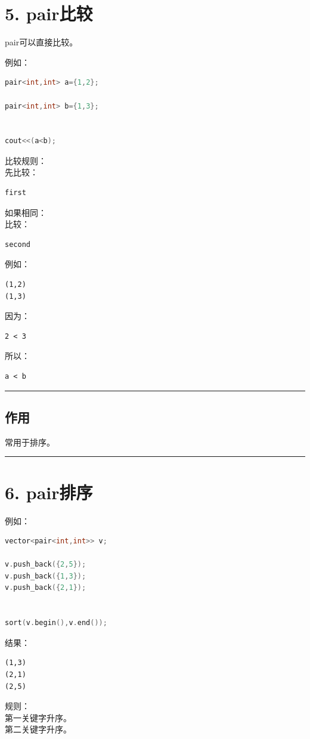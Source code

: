 \documentclass[10pt,twocolumn]{extarticle}
\begin{document}
\section{5. pair比较}

pair可以直接比较。

例如：
\begin{lstlisting}[language=C++]
pair<int,int> a={1,2};

pair<int,int> b={1,3};


cout<<(a<b);
\end{lstlisting}
比较规则：\\
先比较：
\begin{lstlisting}
first
\end{lstlisting}
如果相同：\\
比较：
\begin{lstlisting}
second
\end{lstlisting}
例如：
\begin{lstlisting}
(1,2)
(1,3)
\end{lstlisting}
因为：
\begin{lstlisting}
2 < 3
\end{lstlisting}
所以：
\begin{lstlisting}
a < b
\end{lstlisting}

\noindent\rule{\linewidth}{0.4pt}

\subsection{作用}
常用于排序。

\noindent\rule{\linewidth}{0.4pt}

\section{6. pair排序}

例如：
\begin{lstlisting}[language=C++]
vector<pair<int,int>> v;

v.push_back({2,5});
v.push_back({1,3});
v.push_back({2,1});


sort(v.begin(),v.end());
\end{lstlisting}
结果：
\begin{lstlisting}
(1,3)
(2,1)
(2,5)
\end{lstlisting}
规则：\\
第一关键字升序。\\
第二关键字升序。
\end{document}
